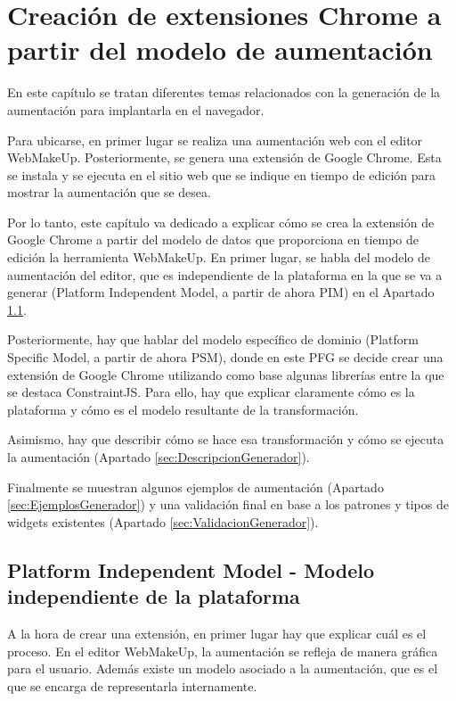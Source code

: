 \chapter{Creación de extensiones Chrome a partir del modelo de aumentación}
\label{cha:generador}

En este capítulo se tratan diferentes temas relacionados con la generación de la aumentación para implantarla en el navegador.

Para ubicarse, en primer lugar se realiza una aumentación web con el editor WebMakeUp. Posteriormente, se genera una extensión de Google Chrome. Esta se instala y se ejecuta en el sitio web que se indique en tiempo de edición para mostrar la aumentación que se desea.

Por lo tanto, este capítulo va dedicado a explicar cómo se crea la extensión de Google Chrome a partir del modelo de datos que proporciona en tiempo de edición la herramienta WebMakeUp. En primer lugar, se habla del modelo de aumentación del editor, que es independiente de la plataforma en la que se va a generar (Platform Independent Model, a partir de ahora PIM) en el Apartado \ref{sec:PIM}.

Posteriormente, hay que hablar del modelo específico de dominio (Platform Specific Model, a partir de ahora PSM), donde en este PFG se decide crear una extensión de Google Chrome utilizando como base algunas librerías entre la que se destaca ConstraintJS. Para ello, hay que explicar claramente cómo es la plataforma y cómo es el modelo resultante de la transformación.

Asimismo, hay que describir cómo se hace esa transformación y cómo se ejecuta la aumentación (Apartado \ref{sec:DescripcionGenerador}).

Finalmente se muestran algunos ejemplos de aumentación (Apartado \ref{sec:EjemplosGenerador}) y una validación final en base a los patrones y tipos de widgets existentes (Apartado \ref{sec:ValidacionGenerador}).

\section{Platform Independent Model - Modelo independiente de la plataforma}
\label{sec:PIM}

A la hora de crear una extensión, en primer lugar hay que explicar cuál es el proceso. En el editor WebMakeUp, la aumentación se refleja de manera gráfica para el usuario. Además existe un modelo asociado a la aumentación, que es el que se encarga de representarla internamente.


